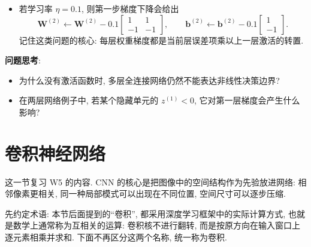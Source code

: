 \documentclass{../nndlcourse}
\begin{document}
\begin{enumerate}
\begin{itemize}
\[            =
            \begin{bmatrix}
            0\\
            2
            \end{bmatrix}.
        \]
        这一步体现了链式法则: 输出层误差先乘以 ${\left(\boldsymbol{W}^{(2)}\right)}^{\top}$ 回传到隐藏层, 再乘以 ReLU 的导数.
        \item 若学习率 $\eta=0.1$, 则第一步梯度下降会给出
        \[
            \boldsymbol{W}^{(2)}
            \leftarrow
            \boldsymbol{W}^{(2)}
            -
            0.1
            \begin{bmatrix}
            1 & 1\\
            -1 & -1
            \end{bmatrix},
            \qquad
            \boldsymbol{b}^{(2)}
            \leftarrow
            \boldsymbol{b}^{(2)}
            -
            0.1
            \begin{bmatrix}
            1\\
            -1
            \end{bmatrix}.
        \]
        记住这类问题的核心: 每层权重梯度都是当前层误差项乘以上一层激活的转置.
    \end{itemize}
\end{enumerate}

\textbf{问题思考}:
\begin{itemize}
    \item 为什么没有激活函数时, 多层全连接网络仍然不能表达非线性决策边界?
    \item 在两层网络例子中, 若某个隐藏单元的 $z^{(1)}<0$, 它对第一层梯度会产生什么影响?
\end{itemize}

\section{卷积神经网络}

这一节复习 W5 的内容. CNN 的核心是把图像中的空间结构作为先验放进网络: 相邻像素更相关, 同一种局部模式可以出现在不同位置, 空间尺寸可以逐步压缩.

先约定术语: 本节后面提到的“卷积”, 都采用深度学习框架中的实际计算方式, 也就是数学上通常称为互相关的运算: 卷积核不进行翻转, 而是按原方向在输入窗口上逐元素相乘并求和. 下面不再区分这两个名称, 统一称为卷积.
\end{document}
